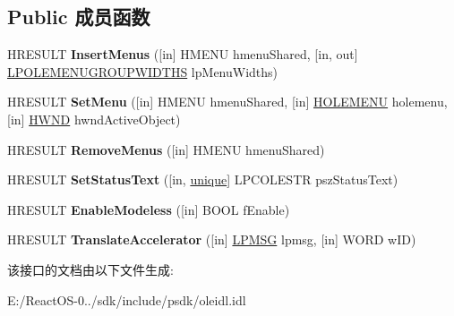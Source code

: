 \subsection*{Public 成员函数}
\begin{DoxyCompactItemize}
\item 
\mbox{\label{interface_i_ole_in_place_frame_aa8abb5a80908f896b0f924f190d5de5a}} 
H\+R\+E\+S\+U\+LT {\bfseries Insert\+Menus} (\mbox{[}in\mbox{]} H\+M\+E\+NU hmenu\+Shared, \mbox{[}in, out\mbox{]} \hyperlink{struct_i_ole_in_place_frame_1_1tag_ole_menu_group_widths}{L\+P\+O\+L\+E\+M\+E\+N\+U\+G\+R\+O\+U\+P\+W\+I\+D\+T\+HS} lp\+Menu\+Widths)
\item 
\mbox{\label{interface_i_ole_in_place_frame_affcfd08c371f69a118e60450f963a93f}} 
H\+R\+E\+S\+U\+LT {\bfseries Set\+Menu} (\mbox{[}in\mbox{]} H\+M\+E\+NU hmenu\+Shared, \mbox{[}in\mbox{]} \hyperlink{interfacevoid}{H\+O\+L\+E\+M\+E\+NU} holemenu, \mbox{[}in\mbox{]} \hyperlink{interfacevoid}{H\+W\+ND} hwnd\+Active\+Object)
\item 
\mbox{\label{interface_i_ole_in_place_frame_ae1baa337fc249d1273aee29c249e14b3}} 
H\+R\+E\+S\+U\+LT {\bfseries Remove\+Menus} (\mbox{[}in\mbox{]} H\+M\+E\+NU hmenu\+Shared)
\item 
\mbox{\label{interface_i_ole_in_place_frame_af4dbac1b0b50a80e1bce69c19e1f5294}} 
H\+R\+E\+S\+U\+LT {\bfseries Set\+Status\+Text} (\mbox{[}in, \hyperlink{interfaceunique}{unique}\mbox{]} L\+P\+C\+O\+L\+E\+S\+TR psz\+Status\+Text)
\item 
\mbox{\label{interface_i_ole_in_place_frame_a2582a82ffcff42926476f06165a81820}} 
H\+R\+E\+S\+U\+LT {\bfseries Enable\+Modeless} (\mbox{[}in\mbox{]} B\+O\+OL f\+Enable)
\item 
\mbox{\label{interface_i_ole_in_place_frame_af6cafbd363b33e45810acbdbea5a3c80}} 
H\+R\+E\+S\+U\+LT {\bfseries Translate\+Accelerator} (\mbox{[}in\mbox{]} \hyperlink{structtag_m_s_g}{L\+P\+M\+SG} lpmsg, \mbox{[}in\mbox{]} W\+O\+RD w\+ID)
\end{DoxyCompactItemize}


该接口的文档由以下文件生成\+:\begin{DoxyCompactItemize}
\item 
E\+:/\+React\+O\+S-\/0../sdk/include/psdk/oleidl.\+idl\end{DoxyCompactItemize}
